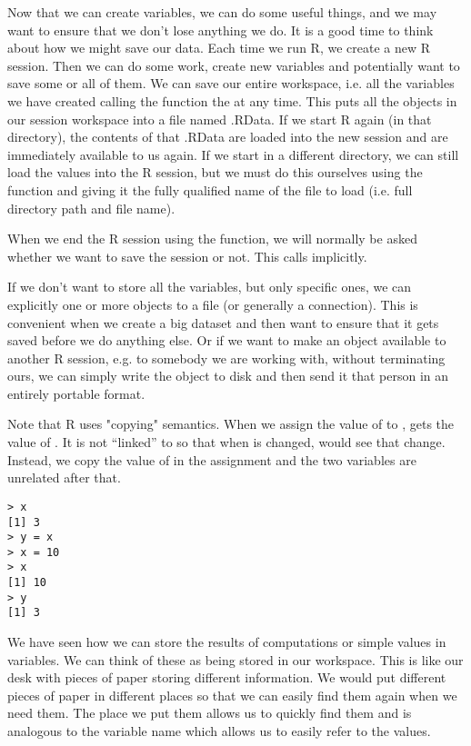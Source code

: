 Now that we can create variables, we can do some useful things, and we
may want to ensure that we don't lose anything we do. It is a good
time to think about how we might save our data. Each time we run R, we
create a new R session. Then we can do some work, create new variables
and potentially want to save some or all of them. We can save our
entire workspace, i.e. all the variables we have created calling the
function the  at any time. This puts all the
objects in our session workspace into a file named .RData. If we
start R again (in that directory), the contents of that .RData are
loaded into the new session and are immediately available to us
again. If we start in a different directory, we can still load the
values into the R session, but we must do this ourselves using the
function  and giving it the fully qualified name of
the file to load (i.e. full directory path and file name).

When we end the R session using the  function, we will
normally be asked whether we want to save the session or not. This
calls  implicitly.

If we don't want to store all the variables, but only specific ones,
we can explicitly  one or more objects to a file (or
generally a connection). This is convenient when we create a big
dataset and then want to ensure that it gets saved before we do
anything else. Or if we want to make an object available to another R
session, e.g. to somebody we are working with, without terminating
ours, we can simply write the object to disk and then send it that
person in an entirely portable format.

Note that R uses "copying" semantics. When we assign the value of
 to ,  gets the value of
. It is not ``linked'' to  so that when
 is changed,  would see that
change. Instead, we copy the value of  in the assignment
and the two variables are unrelated after that.
\begin{verbatim}
> x
[1] 3
> y = x
> x = 10
> x
[1] 10
> y
[1] 3
\end{verbatim}
We have seen how we can store the results of computations or simple
values in variables. We can think of these as being stored in our
workspace. This is like our desk with pieces of paper storing
different information. We would put different pieces of paper in
different places so that we can easily find them again when we need
them. The place we put them allows us to quickly find them and is
analogous to the variable name which allows us to easily refer to the
values.

